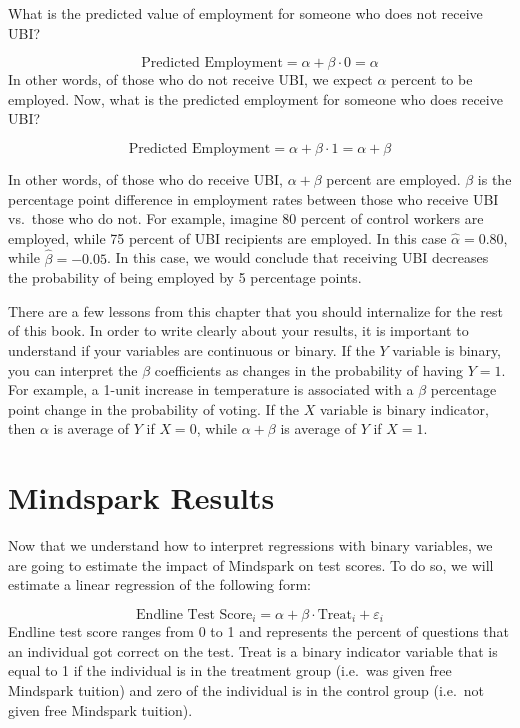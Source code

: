 \documentclass[
]{book}
\begin{document}
What is the predicted value of employment for someone who does not receive UBI?

\[ 
\text{Predicted Employment} = \alpha + \beta \cdot 0 =\alpha
\]
In other words, of those who do not receive UBI, we expect \(\alpha\) percent to be employed. Now, what is the predicted employment for someone who does receive UBI?

\[ 
\text{Predicted Employment} = \alpha + \beta \cdot 1 =\alpha + \beta
\]

In other words, of those who do receive UBI, \(\alpha + \beta\) percent are employed. \(\beta\) is the percentage point difference in employment rates between those who receive UBI vs.~those who do not. For example, imagine 80 percent of control workers are employed, while 75 percent of UBI recipients are employed. In this case \(\hat{\alpha}=0.80\), while \(\hat{\beta}=-0.05\). In this case, we would conclude that receiving UBI decreases the probability of being employed by 5 percentage points.

There are a few lessons from this chapter that you should internalize for the rest of this book. In order to write clearly about your results, it is important to understand if your variables are continuous or binary. If the \(Y\) variable is binary, you can interpret the \(\beta\) coefficients as changes in the probability of having \(Y=1\). For example, a 1-unit increase in temperature is associated with a \(\beta\) percentage point change in the probability of voting. If the \(X\) variable is binary indicator, then \(\alpha\) is average of \(Y\) if \(X=0\), while \(\alpha+\beta\) is average of \(Y\) if \(X=1\).

\section{Mindspark Results}\label{mindspark-results}

Now that we understand how to interpret regressions with binary variables, we are going to estimate the impact of Mindspark on test scores. To do so, we will estimate a linear regression of the following form:

\[
\text{Endline Test Score}_i = \alpha + \beta \cdot \text{Treat}_i + \varepsilon_i
\]
Endline test score ranges from 0 to 1 and represents the percent of questions that an individual got correct on the test. Treat is a binary indicator variable that is equal to 1 if the individual is in the treatment group (i.e.~was given free Mindspark tuition) and zero of the individual is in the control group (i.e.~not given free Mindspark tuition).
\end{document}
